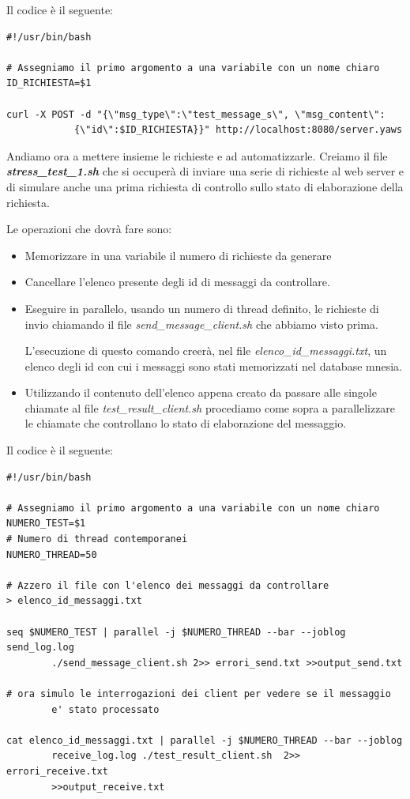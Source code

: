 Il codice \`e il seguente:
\begin{verbatim}
#!/usr/bin/bash

# Assegniamo il primo argomento a una variabile con un nome chiaro
ID_RICHIESTA=$1

curl -X POST -d "{\"msg_type\":\"test_message_s\", \"msg_content\": 
			{\"id\":$ID_RICHIESTA}}" http://localhost:8080/server.yaws

\end{verbatim}

Andiamo ora a mettere insieme le richieste e ad automatizzarle. 
Creiamo il file \textbf{\textit{stress\_test\_1.sh}} che si occuper\`a di inviare una serie di richieste al web server e di simulare anche una prima richiesta di controllo sullo stato di elaborazione della richiesta.

Le operazioni che dovr\`a fare sono:
\begin{itemize}
	\item Memorizzare in una variabile il numero di richieste da generare
	\item Cancellare l'elenco presente degli id di messaggi da controllare.
	\item Eseguire in parallelo, usando un numero di thread definito, le richieste di invio chiamando il file \textit{send\_message\_client.sh} che abbiamo visto prima.
	
	L'esecuzione di questo comando creer\`a, nel file \textit{elenco\_id\_messaggi.txt}, un elenco degli id con cui i messaggi sono stati memorizzati nel database mnesia.
	\item Utilizzando il contenuto dell'elenco appena creato da passare alle singole chiamate al file \textit{test\_result\_client.sh} procediamo come sopra a parallelizzare le chiamate che controllano lo stato di elaborazione del messaggio. 
\end{itemize}

Il codice \`e il seguente:

\begin{verbatim}
#!/usr/bin/bash

# Assegniamo il primo argomento a una variabile con un nome chiaro
NUMERO_TEST=$1
# Numero di thread contemporanei
NUMERO_THREAD=50

# Azzero il file con l'elenco dei messaggi da controllare
> elenco_id_messaggi.txt

seq $NUMERO_TEST | parallel -j $NUMERO_THREAD --bar --joblog send_log.log
		./send_message_client.sh 2>> errori_send.txt >>output_send.txt

# ora simulo le interrogazioni dei client per vedere se il messaggio 
		e' stato processato

cat elenco_id_messaggi.txt | parallel -j $NUMERO_THREAD --bar --joblog 
		receive_log.log ./test_result_client.sh  2>> errori_receive.txt 
		>>output_receive.txt

\end{verbatim}


